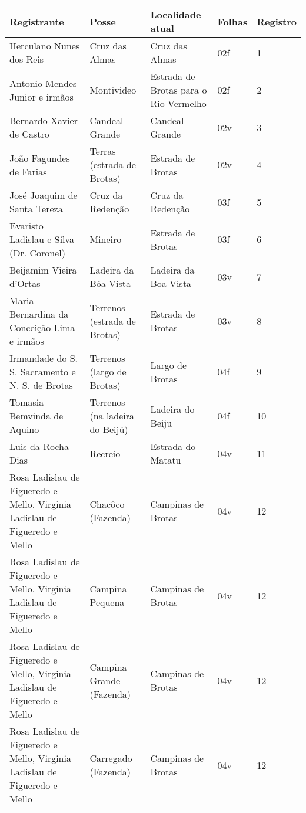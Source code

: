 \begin{table}[!htp]
{
\begin{minipage}{\textwidth}
\begin{tiny}
\begin{tabular}{p{4cm}p{4cm}p{4cm}ll}
\toprule
Registrante									&Posse					&Localidade atual			&Folhas			&Registro		\\
\midrule
\midrule
Herculano Nunes dos Reis							&Cruz das Almas				&Cruz das Almas				&02f			&1			\\
Antonio Mendes Junior e irmãos							&Montivideo				&Estrada de Brotas para o Rio Vermelho				&02f			&2			\\
Bernardo Xavier de Castro							&Candeal Grande				&Candeal Grande				&02v			&3			\\
João Fagundes de Farias								&Terras (estrada de Brotas)		&Estrada de Brotas			&02v			&4			\\
José Joaquim de Santa Tereza							&Cruz da Redenção			&Cruz da Redenção			&03f			&5			\\
Evaristo Ladislau e Silva (Dr. Coronel)						&Mineiro				&Estrada de Brotas				&03f			&6			\\
Beijamim Vieira d'Ortas								&Ladeira da Bôa-Vista			&Ladeira da Boa Vista			&03v			&7			\\
Maria Bernardina da Conceição Lima e irmãos					&Terrenos (estrada de Brotas)		&Estrada de Brotas			&03v			&8			\\
Irmandade do S. S. Sacramento e N. S. de Brotas					&Terrenos (largo de Brotas)		&Largo de Brotas			&04f			&9			\\
Tomasia Bemvinda de Aquino							&Terrenos (na ladeira do Beijú)		&Ladeira do Beiju			&04f			&10			\\
Luis da Rocha Dias 								&Recreio				&Estrada do Matatu			&04v			&11			\\
Rosa Ladislau de Figueredo e Mello, Virginia Ladislau de Figueredo e Mello	&Chacôco (Fazenda)			&Campinas de Brotas			&04v			&12			\\
Rosa Ladislau de Figueredo e Mello, Virginia Ladislau de Figueredo e Mello	&Campina Pequena			&Campinas de Brotas			&04v			&12			\\
Rosa Ladislau de Figueredo e Mello, Virginia Ladislau de Figueredo e Mello	&Campina Grande (Fazenda)		&Campinas de Brotas			&04v			&12			\\
Rosa Ladislau de Figueredo e Mello, Virginia Ladislau de Figueredo e Mello	&Carregado (Fazenda)			&Campinas de Brotas			&04v			&12			\\

\end{tabular}
\end{tiny}
\end{minipage}}
\end{table}
